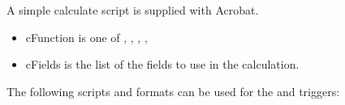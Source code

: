 \documentclass[letterpaper,12pt,english,openany,oneside]{sphinxmanual}
\begin{document}

A simple calculate script is supplied with Acrobat.

\begin{sphinxVerbatim}[commandchars=\\\{\}]
 
\end{sphinxVerbatim}
\begin{itemize}
\item {} 
cFunction is one of , , , , 

\item {} 
cFields is the list of the fields to use in the calculation.

\end{itemize}


The following scripts and formats can be used for the  and  triggers:
\end{document}
